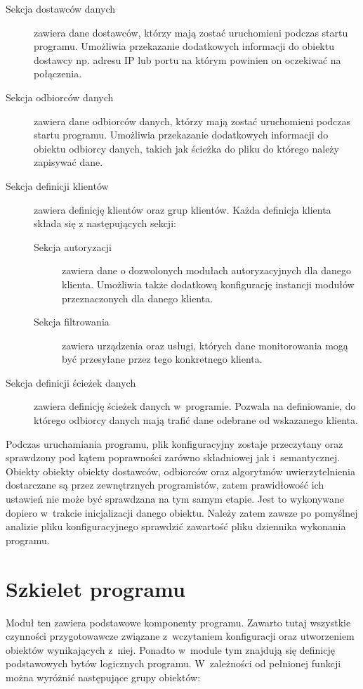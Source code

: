 \begin{description}
\item[Sekcja dostawców danych] zawiera dane dostawców, którzy mają
  zostać uruchomieni podczas startu programu. Umożliwia przekazanie
  dodatkowych informacji do obiektu dostawcy np. adresu IP lub portu
  na którym powinien on oczekiwać na połączenia. 
\item[Sekcja odbiorców danych] zawiera dane odbiorców danych, którzy
  mają zostać uruchomieni podczas startu programu. Umożliwia
  przekazanie dodatkowych informacji do obiektu odbiorcy danych,
  takich jak ścieżka do pliku do którego należy zapisywać dane. 
\item[Sekcja definicji klientów] zawiera definicję klientów oraz grup
  klientów. Każda definicja klienta składa się z następujących sekcji:
  \begin{description}
  \item[Sekcja autoryzacji] zawiera dane o dozwolonych modułach
    autoryzacyjnych dla danego klienta. Umożliwia także dodatkową
    konfigurację instancji modułów przeznaczonych dla danego klienta.
  \item[Sekcja filtrowania] zawiera urządzenia oraz usługi, których
    dane monitorowania mogą być przesyłane przez tego konkretnego
    klienta.
  \end{description}
\item[Sekcja definicji ścieżek danych] zawiera definicję ścieżek
  danych w~programie. Pozwala na definiowanie, do którego odbiorcy
  danych mają trafić dane odebrane od wskazanego klienta.
\end{description}

Podczas uruchamiania programu, plik konfiguracyjny zostaje przeczytany
oraz sprawdzony pod kątem poprawności zarówno składniowej jak
i~semantycznej. Obiekty obiekty obiekty dostawców, odbiorców oraz
algorytmów uwierzytelnienia dostarczane są przez zewnętrznych
programistów, zatem prawidłowość ich ustawień nie może być sprawdzana
na tym samym etapie. Jest to wykonywane dopiero w~trakcie
inicjalizacji danego obiektu. Należy zatem zawsze po pomyślnej
analizie pliku konfiguracyjnego sprawdzić zawartość pliku dziennika
wykonania programu.

\section[Szkielet programu][Szkielet programu]{Szkielet programu}

Moduł ten zawiera podstawowe komponenty programu. Zawarto tutaj
wszystkie czynności przygotowawcze związane z~wczytaniem konfiguracji
oraz utworzeniem obiektów wynikających z~niej. Ponadto w~module tym
znajdują się definicję podstawowych bytów logicznych
programu. W~zależności od pełnionej funkcji można wyróżnić następujące
grupy obiektów:


